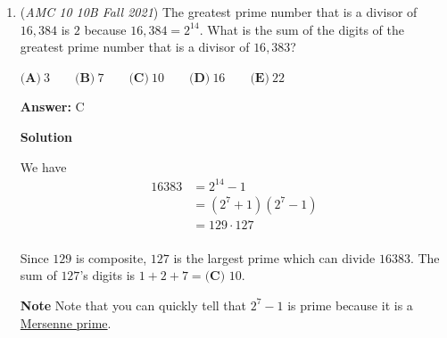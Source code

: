 \begin{enumerate}
\textbf{Solution 3 (Casework)}

We split this up into two cases:

 \textbf{Case 1: integer + integer}

 The whole numbers we have are $\frac{10}{5}$ (or $2$), $\frac{12}{3}$ (or $4$), and $\frac{14}{1}$ (or $14$). There are $\dbinom{3}{2}=3$ ways to choose different-numbered pairs and $3$ ways to choose the same-numbered pairs. So, $3+3=6$.

 \textbf{Case 2: fraction + fraction}

 The fractions we have are $\frac{5}{10}$ (or $\frac{1}{2}$), $\frac{9}{6}$ (or $\frac{3}{2}$), and $\frac{13}{2}$. Similarly, there are $\dbinom{3}{2}=3$ ways to choose different-numbered pairs and $3$ ways to choose the same-numbered pairs. So, $3+3=6$.

 Thus, $6+6=12$.

 So now you would just go ahead and innocently choose $\textbf{(D) }12$, right? No! We overcounted $8$, as $\frac{13}{2}+\frac96=\frac{12}{3}+\frac{12}{3}=8$. Therefore, the correct answer is actually $12-1=\boxed{\textbf{(C)}\  11}$.

 


	\item (\textit{AMC 10 10B Fall 2021}) The greatest prime number that is a divisor of $16{,}384$ is $2$ because $16{,}384 = 2^{14}$. What is the sum of the digits of the greatest prime number that is a divisor of $16{,}383$?


 $\textbf{(A)} \: 3\qquad\textbf{(B)} \: 7\qquad\textbf{(C)} \: 10\qquad\textbf{(D)} \: 16\qquad\textbf{(E)} \: 22$

 \textbf{Answer: }C



\textbf{Solution}

We have
 \begin{align*} 16383 & = 2^{14} - 1 \\ & = \left( 2^7 + 1 \right) \left( 2^7 - 1 \right) \\ & = 129 \cdot 127 \\ \end{align*}


 Since $129$ is composite, $127$ is the largest prime which can divide $16383$. The sum of $127$'s digits is $1+2+7=\boxed{\textbf{(C) }10}$.

 \textbf{Note} Note that you can quickly tell that $2^7 -1$ is prime because it is a \href{https://artofproblemsolving.com/wiki/index.php?title=Mersenne\_prime}{Mersenne prime}.


\end{enumerate}
